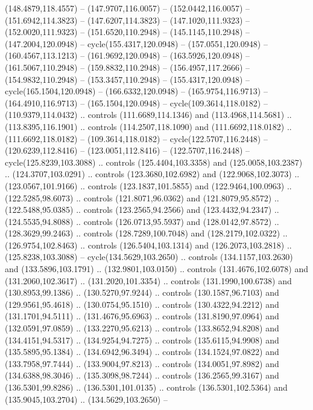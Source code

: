 \begin{scope}[cm={{1.25,0.0,0.0,-1.25,(0.0,442.91375)}}]
    (148.4879,118.4557) -- (147.9707,116.0057) -- (152.0442,116.0057) --
    (151.6942,114.3823) -- (147.6207,114.3823) -- (147.1020,111.9323) --
    (152.0020,111.9323) -- (151.6520,110.2948) -- (145.1145,110.2948) --
    (147.2004,120.0948) -- cycle(155.4317,120.0948) -- (157.0551,120.0948) --
    (160.4567,113.1213) -- (161.9692,120.0948) -- (163.5926,120.0948) --
    (161.5067,110.2948) -- (159.8832,110.2948) -- (156.4957,117.2666) --
    (154.9832,110.2948) -- (153.3457,110.2948) -- (155.4317,120.0948) --
    cycle(165.1504,120.0948) -- (166.6332,120.0948) -- (165.9754,116.9713) --
    (164.4910,116.9713) -- (165.1504,120.0948) -- cycle(109.3614,118.0182) --
    (110.9379,114.0432) .. controls (111.6689,114.1346) and (113.4968,114.5681) ..
    (113.8395,116.1901) .. controls (114.2507,118.1090) and (111.6692,118.0182) ..
    (111.6692,118.0182) -- (109.3614,118.0182) -- cycle(122.5707,116.2448) --
    (120.6239,112.8416) -- (123.0051,112.8416) -- (122.5707,116.2448) --
    cycle(125.8239,103.3088) .. controls (125.4404,103.3358) and
    (125.0058,103.2387) .. (124.3707,103.0291) .. controls (123.3680,102.6982) and
    (122.9068,102.3073) .. (123.0567,101.9166) .. controls (123.1837,101.5855) and
    (122.9464,100.0963) .. (122.5285,98.6073) .. controls (121.8071,96.0362) and
    (121.8079,95.8572) .. (122.5488,95.0385) .. controls (123.2565,94.2566) and
    (123.4432,94.2347) .. (124.5535,94.8088) .. controls (126.0713,95.5937) and
    (128.0142,97.8572) .. (128.3629,99.2463) .. controls (128.7289,100.7048) and
    (128.2179,102.0322) .. (126.9754,102.8463) .. controls (126.5404,103.1314) and
    (126.2073,103.2818) .. (125.8238,103.3088) -- cycle(134.5629,103.2650) ..
    controls (134.1157,103.2630) and (133.5896,103.1791) .. (132.9801,103.0150) ..
    controls (131.4676,102.6078) and (131.2060,102.3617) .. (131.2020,101.3354) ..
    controls (131.1990,100.6738) and (130.8953,99.1386) .. (130.5270,97.9244) ..
    controls (130.1587,96.7103) and (129.9561,95.4618) .. (130.0754,95.1510) ..
    controls (130.4322,94.2212) and (131.1701,94.5111) .. (131.4676,95.6963) ..
    controls (131.8190,97.0964) and (132.0591,97.0859) .. (133.2270,95.6213) ..
    controls (133.8652,94.8208) and (134.4151,94.5317) .. (134.9254,94.7275) ..
    controls (135.6115,94.9908) and (135.5895,95.1384) .. (134.6942,96.3494) ..
    controls (134.1524,97.0822) and (133.7958,97.7444) .. (133.9004,97.8213) ..
    controls (134.0051,97.8982) and (134.6388,98.3046) .. (135.3098,98.7244) ..
    controls (136.2565,99.3167) and (136.5301,99.8286) .. (136.5301,101.0135) ..
    controls (136.5301,102.5364) and (135.9045,103.2704) .. (134.5629,103.2650) --

\end{scope}
